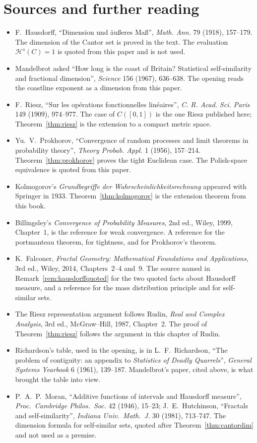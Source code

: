 \section*{Sources and further reading}

\begin{itemize}
\item F.~Hausdorff, ``Dimension und \"au\ss eres Ma\ss'', \emph{Math. Ann.} 79 (1918), 157--179. The dimension of the Cantor set is proved in
the text. The evaluation $\mathcal H^s(C)=1$ is quoted from this paper and is not used.
\item Mandelbrot asked ``How long is the coast of Britain? Statistical self-similarity and fractional dimension'', \emph{Science} 156 (1967),
636--638. The opening reads the coastline exponent as a dimension from this paper.
\item F.~Riesz, ``Sur les op\'erations fonctionnelles lin\'eaires'', \emph{C. R. Acad. Sci. Paris} 149 (1909), 974--977. The case of $C([0,1])$
is the one Riesz published here; Theorem~\ref{thm:riesz} is the extension to a compact metric space.
\item Yu.~V.~Prokhorov, ``Convergence of random processes and limit theorems in probability theory'', \emph{Theory Probab. Appl.} 1 (1956),
157--214. Theorem~\ref{thm:prokhorov} proves the tight Euclidean case. The Polish-space equivalence is quoted from this paper.
\item Kolmogorov's \emph{Grundbegriffe der Wahrscheinlichkeitsrechnung} appeared with Springer in 1933. Theorem~\ref{thm:kolmogorov} is the extension
theorem from this book.
\item Billingsley's \emph{Convergence of Probability Measures}, 2nd ed., Wiley, 1999, Chapter~1, is the reference for weak convergence. A reference for the portmanteau theorem,
for tightness, and for Prokhorov's theorem.
\item K.~Falconer, \emph{Fractal Geometry: Mathematical Foundations and Applications}, 3rd ed., Wiley, 2014, Chapters~2--4 and~9. The source
named in Remark~\ref{rem:hausdorffquoted} for the two quoted facts about Hausdorff measure, and a reference for the mass distribution
principle and for self-similar sets.
\item The Riesz representation argument follows Rudin, \emph{Real and Complex Analysis}, 3rd ed., McGraw--Hill, 1987, Chapter~2. The proof of Theorem~\ref{thm:riesz} follows the
argument in this chapter of Rudin.
\item Richardson's table, used in the opening, is in L.~F.~Richardson, ``The problem of contiguity: an appendix to \emph{Statistics of Deadly
Quarrels}'', \emph{General Systems Yearbook} 6 (1961), 139--187. Mandelbrot's paper, cited above, is what brought the table into view.
\item P.~A.~P.~Moran, ``Additive functions of intervals and Hausdorff measure'', \emph{Proc.\ Cambridge Philos.\ Soc.} 42 (1946), 15--23;
J.~E.~Hutchinson, ``Fractals and self-similarity'', \emph{Indiana Univ.\ Math.\ J.} 30 (1981), 713--747. The dimension formula for
self-similar sets, quoted after Theorem~\ref{thm:cantordim} and not used as a premise.
\end{itemize}
